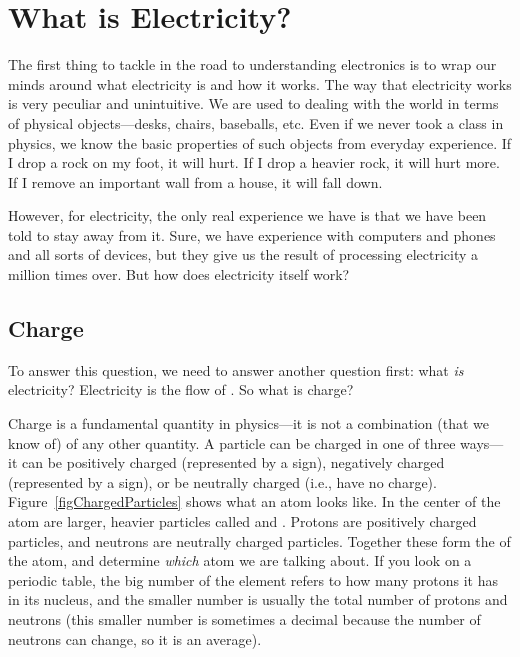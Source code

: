 \chapter{What is Electricity?}

The first thing to tackle in the road to understanding electronics is to wrap our minds around what electricity is and how it works.
The way that electricity works is very peculiar and unintuitive.
We are used to dealing with the world in terms of physical objects---desks, chairs, baseballs, etc.
Even if we never took a class in physics, we know the basic properties of such objects from everyday experience.
If I drop a rock on my foot, it will hurt.
If I drop a heavier rock, it will hurt more.
If I remove an important wall from a house, it will fall down.

However, for electricity, the only real experience we have is that we have been told to stay away from it.
Sure, we have experience with computers and phones and all sorts of devices, but they give us the result of processing electricity a million times over.
But how does electricity itself work?

\section{Charge}

To answer this question, we need to answer another question first: what \emph{is} electricity?
Electricity is the flow of .
So what is charge?

Charge is a fundamental quantity in physics---it is not a combination (that we know of) of any other quantity.
A particle can be charged in one of three ways---it can be positively charged (represented by a \icode{+} sign), negatively charged (represented by a \icode{-} sign), or be neutrally charged (i.e., have no charge).
Figure~\ref{figChargedParticles} shows what an atom looks like.  
In the center of the atom are larger, heavier particles called  and .
Protons are positively charged particles, and neutrons are neutrally charged particles.
Together these form the  of the atom, and determine \emph{which} atom we are talking about.
If you look on a periodic table, the big number of the element refers to how many protons it has in its nucleus, and the smaller number is usually the total number of protons and neutrons (this smaller number is sometimes a decimal because the number of neutrons can change, so it is an average).

